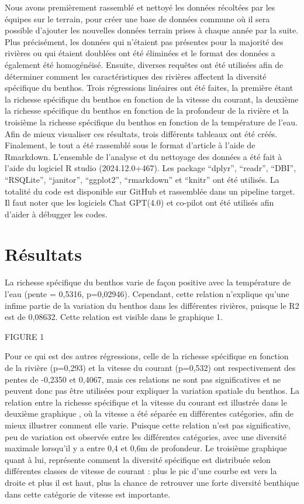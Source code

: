 \documentclass[9pt,twocolumn,twoside,]{pnas-new}
\begin{document}
Nous avons premièrement rassemblé et nettoyé les données récoltées par
les équipes sur le terrain, pour créer une base de données commune où il
sera possible d'ajouter les nouvelles données terrain prises à chaque
année par la suite. Plus précisément, les données qui n'étaient pas
présentes pour la majorité des rivières ou qui étaient doublées ont été
éliminées et le format des données a également été homogénéisé. Ensuite,
diverses requêtes ont été utilisées afin de déterminer comment les
caractéristiques des rivières affectent la diversité spécifique du
benthos. Trois régressions linéaires ont été faites, la première étant
la richesse spécifique du benthos en fonction de la vitesse du courant,
la deuxième la richesse spécifique du benthos en fonction de la
profondeur de la rivière et la troisième la richesse spécifique du
benthos en fonction de la température de l'eau. Afin de mieux visualiser
ces résultats, trois différents tableaux ont été créés. Finalement, le
tout a été rassemblé sous le format d'article à l'aide de Rmarkdown.
L'ensemble de l'analyse et du nettoyage des données a été fait à l'aide
du logiciel R studio (2024.12.0+467). Les package ``dplyr'', ``readr'',
``DBI'', ``RSQLite'', ``janitor'', ``ggplot2'', ``rmarkdown'' et
``knitr'' ont été utilisés. La totalité du code est disponible sur
GitHub et rassemblée dans un pipeline target. Il faut noter que les
logiciels Chat GPT(4.0) et co-pilot ont été utilisés afin d'aider à
débugger les codes.

\section{Résultats}\label{ruxe9sultats}

La richesse spécifique du benthos varie de façon positive avec la
température de l'eau (pente = 0,5316, p=0,02946). Cependant, cette
relation n'explique qu'une infime partie de la variation du benthos dans
les différentes rivières, puisque le R2 est de 0,08632. Cette relation
est visible dans le graphique 1.

FIGURE 1

Pour ce qui est des autres régressions, celle de la richesse spécifique
en fonction de la rivière (p=0,293) et la vitesse du courant (p=0,532)
ont respectivement des pentes de -0,2350 et 0,4067, mais ces relations
ne sont pas significatives et ne peuvent donc pas être utilisées pour
expliquer la variation spatiale du benthos. La relation entre la
richesse spécifique et la vitesse du courant est illustrée dans le
deuxième graphique , où la vitesse a été séparée en différentes
catégories, afin de mieux illustrer comment elle varie. Puisque cette
relation n'est pas significative, peu de variation est observée entre
les différentes catégories, avec une diversité maximale lorsqu'il y a
entre 0,4 et 0,6m de profondeur. Le troisième graphique quant à lui,
représente comment la diversité spécifique est distribuée selon
différentes classes de vitesse de courant : plus le pic d'une courbe est
vers la droite et plus il est haut, plus la chance de retrouver une
forte diversité benthique dans cette catégorie de vitesse est
importante.
\end{document}
